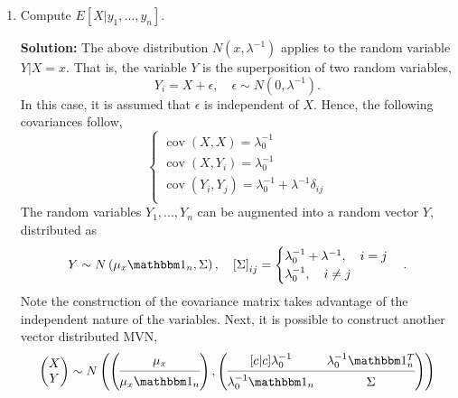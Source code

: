 \documentclass{article}[12pt]
\begin{document}
\begin{enumerate}
\item Compute $E[X|y_1,\ldots,y_n]$.

	\textbf{Solution:} The above distribution $N \left( x, \lambda^{-1} \right)$ applies to the random variable $Y|X=x$. That is, the variable $Y$ is the superposition of two random variables,
	\begin{equation}
		Y_i = X + \epsilon, \quad \epsilon \sim N(0, \lambda^{-1}).
	\end{equation}
	In this case, it is assumed that $\epsilon$ is independent of $X$. Hence, the following covariances follow,
	\begin{equation}
		\begin{cases}
			\operatorname{cov} (X, X) = \lambda_0^{-1}\\
			\operatorname{cov} (X, Y_i) = \lambda_0^{-1} \\
			\operatorname{cov} (Y_i, Y_j) = \lambda_0^{-1} + \lambda^{-1} \delta_{ij} \\
		\end{cases}
	\end{equation}
	The random variables $Y_1,...,Y_n$ can be augmented into a random vector $Y$, distributed as
	\begin{equation}
		Y \sim N \left( \mu_x \mathbbm 1_n, \Sigma  \right), \quad \left[ \Sigma \right]_{ij} = \begin{cases}
			\lambda_0^{-1} + \lambda^{-1}, \quad i = j \\
			\lambda_0^{-1}, \quad i \ne j \\
		\end{cases}.
	\end{equation}
Note the construction of the covariance matrix takes advantage of the independent nature of the variables. Next, it is possible to construct another vector distributed MVN,
\begin{equation} \label{eq:mvnxy}
	\begin{pmatrix}
		X \\ 
		Y \\
	\end{pmatrix} \sim
	N\left( 
		\begin{pmatrix}
			\mu_x \\ 
			\cmidrule(lr){1-1}
			\mu_x \mathbbm 1_n 
		\end{pmatrix},
		\begin{pmatrix} [c | c]
			\lambda_0^{-1} &  \lambda_0^{-1} \mathbbm 1_n^T \\
			\cmidrule(lr){1-2}
			\lambda_0^{-1} \mathbbm 1_n & \Sigma \\
		\end{pmatrix}
	\right)
\end{equation}


\end{enumerate}
\end{document}
